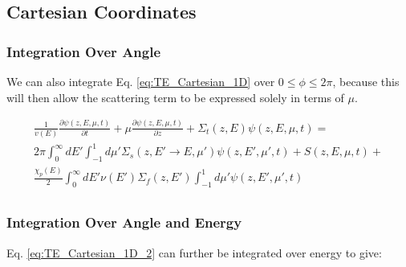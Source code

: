 \documentclass[10pt]{article}
\newcommand{\beqa}{\begin{equation}\begin{aligned}}
\newcommand{\eeqa}{\end{aligned}\end{equation}}
\newcommand{\hO}{\hat{\Omega}}
\newcommand{\spa}{(\vv{r}, E, \hO, t)}
\newcommand{\spas}{(\vv{r},E,t)}
\begin{document}
\begin{flushleft}

\subsection{Cartesian Coordinates}

\subsubsection{Integration Over Angle}

We can also integrate Eq. \ref{eq:TE_Cartesian_1D} over \(0\leq \phi \leq 2\pi\), because this will then allow the scattering term to be expressed solely in terms of \(\mu\). 

\begin{equation}
\label{eq:TE_Cartesian_1D_2}
\begin{aligned}
\frac{1}{v(E)} \frac{\partial\psi(z, E, \mu,t)}{\partial t} + \mu \frac{\partial \psi(z, E, \mu,t)}{\partial z} +
 \Sigma_t(z,E)\psi(z, E, \mu,t) =\\
 2\pi \int_{0}^{\infty}dE' \int_{-1}^{1} d\mu' \Sigma_s(z, E'\rightarrow E, \mu')\psi(z, E', \mu',t) + S(z, E, \mu, t)+\\
 \frac{\chi_p(E)}{2} \int_{0}^{\infty} dE'\nu(E')\Sigma_f(z, E')\int_{-1}^{1} d\mu'\psi(z, E', \mu',t)\\
\end{aligned}
\end{equation}

\subsubsection{Integration Over Angle and Energy}
Eq. \eqref{eq:TE_Cartesian_1D_2} can further be integrated over energy to give:


\end{flushleft}
\end{document}
